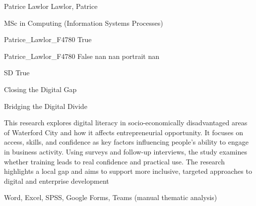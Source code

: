 \documentclass[twoside]{report}
\begin{document}
\begingroup{}\relax



\def\Key{Patrice_Lawlor_F4780}

{Patrice Lawlor}
{Lawlor, Patrice}

{MSc in Computing (Information Systems Processes)}

{Patrice_Lawlor_F4780}
{True}

{Patrice_Lawlor_F4780}
{False}
{nan}
{nan}
{portrait}
{nan}

{SD}
{True}

{Closing the Digital Gap}

{Bridging the Digital Divide}

{This research explores digital literacy in socio-economically disadvantaged areas of Waterford City and how it affects entrepreneurial opportunity. It focuses on access, skills, and confidence as key factors influencing people's ability to engage in business activity. Using surveys and follow-up interviews, the study examines whether training leads to real confidence and practical use. The research highlights a local gap and aims to support more inclusive, targeted approaches to digital and enterprise development}

{Word, Excel, SPSS, Google Forms, Teams (manual thematic analysis)}
\end{document}
